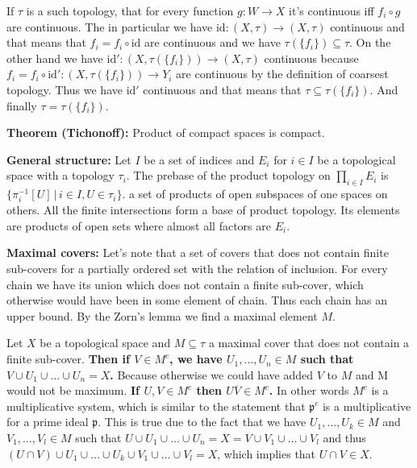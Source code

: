 \documentclass{article}
\begin{document}
If $\tau$ is a such topology, that for every function $g:W\rightarrow X$ it's
continuous iff $f_i\circ g$ are continuous. The in particular we have $\text{id}:
(X, \tau)\rightarrow(X,\tau)$ continuous and that means that $f_i = f_i\circ
\text{id}$ are continuous and we have $\tau(\{f_i\})\subseteq\tau$. On the other
hand we have $\text{id}':(X,\tau(\{f_i\}))\rightarrow(X,\tau)$ continuous
because $f_i = f_i\circ\text{id}':(X,\tau(\{f_i\}))\rightarrow Y_i$ are continuous
by the definition of coarsest topology. Thus we have $\text{id}'$ continuous
and that means that $\tau\subseteq\tau(\{f_i\})$. And finally $\tau=\tau(\{f_i\})$.

\vspace{1ex}

\textbf{Theorem (Tichonoff):} Product of compact spaces is compact.
\vspace{1ex}

\textbf{General structure:} Let $I$ be a set of indices and $E_i$ for $i\in I$
be a topological space with a topology $\tau_i$. The prebase of the product
topology on  $\prod_{i\in I} E_i$ is $\{\pi_i^{-1}[U]\,|\,i\in I,U\in\tau_i\}$.
a set of products of open subspaces of one spaces on others. All the finite
intersections form a base of product topology. Its elements are products of
open sets where almost all factors are $E_i$.
\vspace{1ex}

\textbf{Maximal covers:} Let's note that a set of covers that does not contain
finite sub-covers for a partially ordered set with the relation of inclusion.
For every chain we have its union which does not contain a finite sub-cover,
which otherwise would have been in some element of chain. Thus each chain has an
upper bound. By the Zorn's lemma we find a maximal element $M$.
\vspace{1ex}

Let $X$ be a topological space and $M\subseteq\tau$ a maximal cover that does
not contain a finite sub-cover. \textbf{Then if $V\in M^c$, we have $U_1,\ldots,
U_n\in M$ such that $V\cup U_1\cup\ldots\cup U_n=X$.} Because otherwise we
could have added $V$ to $M$ and M would not be maximum. \textbf{If
$U,V\in M^c$ then $U\overline V\in M^c$.} In other words $M^c$ is a multiplicative
system, which is similar to the statement that $\mathfrak{p}^c$ is a multiplicative
for a prime ideal $\mathfrak{p}$. This is true due to the fact that we have
$U_1,\ldots,U_k\in M$ and $V_1,\ldots,V_l\in M$ such that $U\cup U_1\cup\ldots
\cup U_n = X = V\cup V_1\cup\ldots\cup V_l$ and thus $(U\cap V)\cup U_1\cup\ldots
\cup U_k\cup V_1\cup\ldots\cup V_l=X$, which implies that $U\cap V\in X$.
\vspace{1ex}
\end{document}
